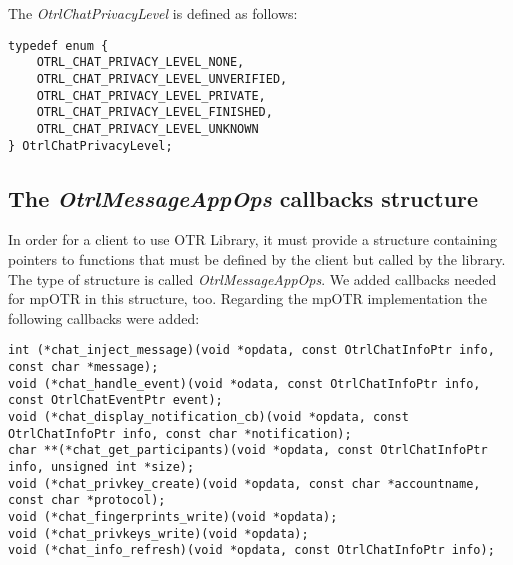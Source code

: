 The \emph{OtrlChatPrivacyLevel} is defined as follows:
\begin{lstlisting}[caption={OtrlChatPrivacyLevel definition}]
typedef enum {
	OTRL_CHAT_PRIVACY_LEVEL_NONE,
	OTRL_CHAT_PRIVACY_LEVEL_UNVERIFIED,
	OTRL_CHAT_PRIVACY_LEVEL_PRIVATE,
	OTRL_CHAT_PRIVACY_LEVEL_FINISHED,
	OTRL_CHAT_PRIVACY_LEVEL_UNKNOWN
} OtrlChatPrivacyLevel;
\end{lstlisting}

\subsection{The \emph{OtrlMessageAppOps} callbacks structure}
\label{section:callbacks_structure}
In order for a client to use OTR Library, it must provide a structure containing pointers to functions that must be defined by the client but called by the library. The type of structure is called \emph{OtrlMessageAppOps}. We added callbacks needed for mpOTR in this structure, too. Regarding the mpOTR implementation the following callbacks were added:

\begin{lstlisting}[caption={mpOTR callbacks in OtrlMessageAppOps}]
int (*chat_inject_message)(void *opdata, const OtrlChatInfoPtr info, const char *message);
void (*chat_handle_event)(void *odata, const OtrlChatInfoPtr info, const OtrlChatEventPtr event);
void (*chat_display_notification_cb)(void *opdata, const OtrlChatInfoPtr info, const char *notification);
char **(*chat_get_participants)(void *opdata, const OtrlChatInfoPtr info, unsigned int *size);
void (*chat_privkey_create)(void *opdata, const char *accountname, const char *protocol);
void (*chat_fingerprints_write)(void *opdata);
void (*chat_privkeys_write)(void *opdata);
void (*chat_info_refresh)(void *opdata, const OtrlChatInfoPtr info);
\end{lstlisting}

